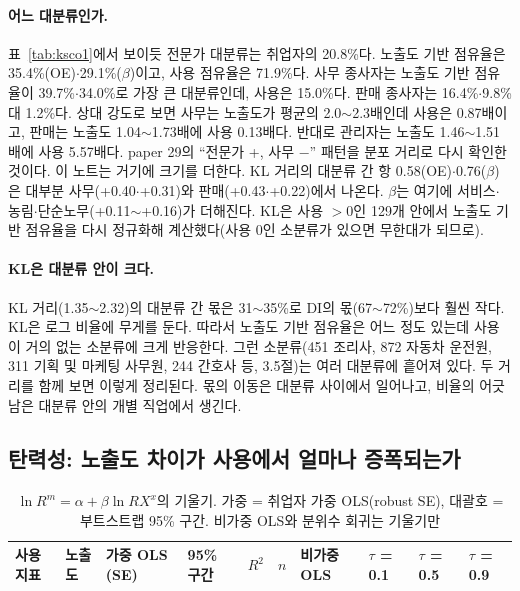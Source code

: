 \documentclass[11pt]{article}
\begin{document}
\paragraph{어느 대분류인가.} 표~\ref{tab:ksco1}에서 보이듯 전문가 대분류는 취업자의 20.8\%다. 노출도 기반 점유율은 35.4\%(OE)$\cdot$29.1\%($\beta$)이고, 사용 점유율은 71.9\%다. 사무 종사자는 노출도 기반 점유율이 39.7\%$\cdot$34.0\%로 가장 큰 대분류인데, 사용은 15.0\%다. 판매 종사자는 16.4\%$\cdot$9.8\% 대 1.2\%다. 상대 강도로 보면 사무는 노출도가 평균의 2.0$\sim$2.3배인데 사용은 0.87배이고, 판매는 노출도 1.04$\sim$1.73배에 사용 0.13배다. 반대로 관리자는 노출도 1.46$\sim$1.51배에 사용 5.57배다. paper 29의 ``전문가 +, 사무 $-$'' 패턴을 분포 거리로 다시 확인한 것이다. 이 노트는 거기에 크기를 더한다. KL 거리의 대분류 간 항 0.58(OE)$\cdot$0.76($\beta$)은 대부분 사무(+0.40$\cdot$+0.31)와 판매(+0.43$\cdot$+0.22)에서 나온다. $\beta$는 여기에 서비스$\cdot$농림$\cdot$단순노무(+0.11$\sim$+0.16)가 더해진다. KL은 사용 $> 0$인 129개 안에서 노출도 기반 점유율을 다시 정규화해 계산했다(사용 0인 소분류가 있으면 무한대가 되므로).

\paragraph{KL은 대분류 안이 크다.} KL 거리(1.35$\sim$2.32)의 대분류 간 몫은 31$\sim$35\%로 DI의 몫(67$\sim$72\%)보다 훨씬 작다. KL은 로그 비율에 무게를 둔다. 따라서 노출도 기반 점유율은 어느 정도 있는데 사용이 거의 없는 소분류에 크게 반응한다. 그런 소분류(451 조리사, 872 자동차 운전원, 311 기획 및 마케팅 사무원, 244 간호사 등, 3.5절)는 여러 대분류에 흩어져 있다. 두 거리를 함께 보면 이렇게 정리된다. 몫의 이동은 대분류 사이에서 일어나고, 비율의 어긋남은 대분류 안의 개별 직업에서 생긴다.

\subsection{탄력성: 노출도 차이가 사용에서 얼마나 증폭되는가}

\begin{small}
\begin{longtable}{L{2.4cm}L{0.8cm}R{2.1cm}R{2.1cm}R{0.9cm}R{0.8cm}R{1.5cm}R{1.1cm}R{1.1cm}R{1.1cm}}
\caption{$\ln R^m = \alpha + \beta \ln RX^x$의 기울기. 가중 = 취업자 가중 OLS(robust SE), 대괄호 = 부트스트랩 95\% 구간. 비가중 OLS와 분위수 회귀는 기울기만}\label{tab:elas}\\
\toprule
사용 지표 & 노출도 & 가중 OLS (SE) & 95\% 구간 & $R^2$ & $n$ & 비가중 OLS & $\tau$ = 0.1 & $\tau$ = 0.5 & $\tau$ = 0.9 \\
\midrule
\endfirsthead

\bottomrule
\end{longtable}
\end{small}
\end{document}

